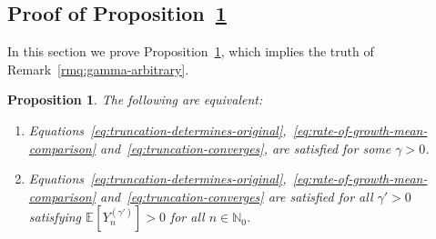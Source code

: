 \documentclass[12pt]{article}
\newtheorem{prop}[thm]{Proposition}
\theoremstyle{definition}
\newcommand{\E}[2][]{\ensuremath{\mathbb{E}_{#1}\left[#2 \right]}}
\begin{document}
\subsection{Proof of Proposition~\ref{prop:gamma-arbitrary}}
In this section we prove Proposition~\ref{prop:gamma-arbitrary}, which implies the truth of Remark~\ref{rmq:gamma-arbitrary}. 
\begin{prop} \label{prop:gamma-arbitrary}
The following are equivalent:
\begin{enumerate}
    \item \label{item:gamma-arbitrary-1} Equations~\eqref{eq:truncation-determines-original},~\eqref{eq:rate-of-growth-mean-comparison} and~\eqref{eq:truncation-converges}, are satisfied for some $\gamma > 0$.
    \item \label{item:gamma-arbitrary-2} Equations~\eqref{eq:truncation-determines-original},~\eqref{eq:rate-of-growth-mean-comparison} and~\eqref{eq:truncation-converges} are satisfied for all $\gamma' > 0$ satisfying $\E{Y^{(\gamma')}_{n}} > 0$ for all $n \in \mathbb{N}_0$.
\end{enumerate}
\end{prop}
\end{document}
